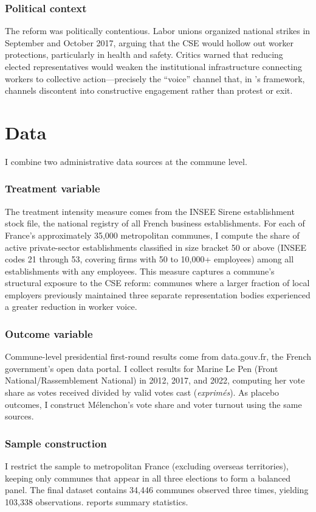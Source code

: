 \documentclass[12pt]{article}
\begin{document}
\subsubsection*{Political context} The reform was politically contentious. Labor unions organized national strikes in September and October 2017, arguing that the CSE would hollow out worker protections, particularly in health and safety. Critics warned that reducing elected representatives would weaken the institutional infrastructure connecting workers to collective action---precisely the ``voice'' channel that, in \citet{hirschman1970}'s framework, channels discontent into constructive engagement rather than protest or exit.


\section{Data}

I combine two administrative data sources at the commune level.

\subsubsection*{Treatment variable} The treatment intensity measure comes from the INSEE Sirene establishment stock file, the national registry of all French business establishments. For each of France's approximately 35,000 metropolitan communes, I compute the share of active private-sector establishments classified in size bracket 50 or above (INSEE codes 21 through 53, covering firms with 50 to 10,000+ employees) among all establishments with any employees. This measure captures a commune's structural exposure to the CSE reform: communes where a larger fraction of local employers previously maintained three separate representation bodies experienced a greater reduction in worker voice.

\subsubsection*{Outcome variable} Commune-level presidential first-round results come from data.gouv.fr, the French government's open data portal. I collect results for Marine Le Pen (Front National/Rassemblement National) in 2012, 2017, and 2022, computing her vote share as votes received divided by valid votes cast (\textit{exprim\'es}). As placebo outcomes, I construct M\'elenchon's vote share and voter turnout using the same sources.

\subsubsection*{Sample construction} I restrict the sample to metropolitan France (excluding overseas territories), keeping only communes that appear in all three elections to form a balanced panel. The final dataset contains 34,446 communes observed three times, yielding 103,338 observations.  reports summary statistics.
\end{document}
